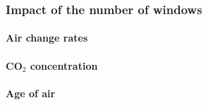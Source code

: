 \enlargethispage*{1.0cm}




\blindtext[1]

\blindtext[1]


\cleartoleftpage

\subsubsection{Impact of the number of windows}
\enlargethispage*{4cm}

\blindtext[1]


\paragraph{Air change rates}

\blindtext[1]


\paragraph{CO$_2$ concentration}

\blindtext[1]


\paragraph{Age of air}

\blindtext[1]




